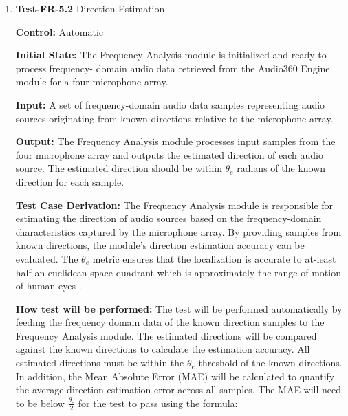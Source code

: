 \documentclass[12pt, titlepage]{article}
\begin{document}
\begin{enumerate}
Accuracy is calculated as follows:
\[
\text{Accuracy}_{\text{class}} = \frac{\text{Number of Correct Predictions For 
Class}}{\text{Total Number of Samples for Class}} \times 100\%
\]

The overall accuracy across all classes is calculated as follows:

\[
\text{Overall Accuracy} = \frac{\Sigma_{\text{class } \in \text{  tests}} 
\text{      Accuracy}_{\text{class}}}{Number of Classes}
\]

\item{\textbf{Test-FR-5.2} Direction Estimation\\}

\textbf{Control:} Automatic

\textbf{Initial State:}
The Frequency Analysis module is initialized and ready to process frequency-
domain audio data retrieved from the Audio360 Engine module for a four
microphone array.

\textbf{Input:}
A set of frequency-domain audio data samples representing audio sources
originating from known directions relative to the microphone array.

\textbf{Output:}
The Frequency Analysis module processes input samples from the four microphone
array and outputs the estimated direction of each audio source. The estimated
direction should be within \hyperref[SRS-symbol:theta_e]{$\theta_e$} radians of
the known direction for each sample.

\textbf{Test Case Derivation:}
The Frequency Analysis module is responsible for estimating the direction of
audio sources based on the frequency-domain characteristics captured by the
microphone array. By providing samples from known directions, the module's
direction estimation accuracy can be evaluated. The
\hyperref[SRS-symbol:theta_e]{$\theta_e$} metric
ensures that the localization is accurate to at-least half an euclidean space
quadrant which is approximately the range of motion of human eyes \cite{Eye_Hang_Woo}. 

\textbf{How test will be performed:}
The test will be performed automatically by feeding the frequency domain data of
the known direction samples to the Frequency Analysis module. The estimated
directions will be compared against the known directions to calculate the
estimation accuracy. All estimated directions must be within the 
\hyperref[SRS-symbol:theta_e]{$\theta_e$} 
threshold of the known directions. In addition, the Mean Absolute Error (MAE)
will be calculated to quantify the average direction estimation error across all
samples. The MAE will need to be below $\frac{\theta_e}{2}$ for the test to pass
using the formula:


\end{enumerate}
\end{document}
